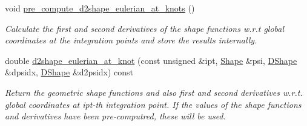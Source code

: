 \begin{DoxyCompactItemize}
void \hyperlink{classoomph_1_1StorableShapeElementBase_a771a9c843fa71c2264ad0d653ec01d1a}{pre\+\_\+compute\+\_\+d2shape\+\_\+eulerian\+\_\+at\+\_\+knots} ()
\begin{DoxyCompactList}\small\item\em Calculate the first and second derivatives of the shape functions w.\+r.\+t global coordinates at the integration points and store the results internally. \end{DoxyCompactList}\item 
double \hyperlink{classoomph_1_1StorableShapeElementBase_aa8d876cca1917be4181a914ef4595c21}{d2shape\+\_\+eulerian\+\_\+at\+\_\+knot} (const unsigned \&ipt, \hyperlink{classoomph_1_1Shape}{Shape} \&psi, \hyperlink{classoomph_1_1DShape}{D\+Shape} \&dpsidx, \hyperlink{classoomph_1_1DShape}{D\+Shape} \&d2psidx) const
\begin{DoxyCompactList}\small\item\em Return the geometric shape functions and also first and second derivatives w.\+r.\+t. global coordinates at ipt-\/th integration point. If the values of the shape functions and derivatives have been pre-\/computred, these will be used. \end{DoxyCompactList}\end{DoxyCompactItemize}
